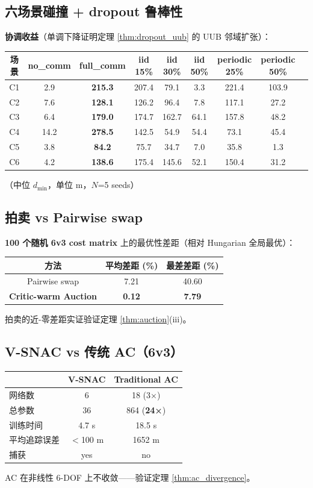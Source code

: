 \documentclass[11pt,a4paper]{article}
\theoremstyle{remark}
\begin{document}
\subsection{六场景碰撞 + dropout 鲁棒性}

\textbf{协调收益}（单调下降证明定理 \ref{thm:dropout_uub} 的 UUB 邻域扩张）：
\begin{center}
\begin{tabular}{c|cccccccc}
\hline
场景 & no\_comm & full\_comm & iid 15\% & iid 30\% & iid 50\% & periodic 25\% & periodic 50\% \\
\hline
C1 & 2.9 & \textbf{215.3} & 207.4 & 79.1 & 3.3 & 221.4 & 103.9 \\
C2 & 7.6 & \textbf{128.1} & 126.2 & 96.4 & 7.8 & 117.1 & 27.2 \\
C3 & 6.4 & \textbf{179.0} & 174.7 & 162.7 & 64.1 & 157.8 & 48.2 \\
C4 & 14.2 & \textbf{278.5} & 142.5 & 54.9 & 54.4 & 73.1 & 45.4 \\
C5 & 3.8 & \textbf{84.2} & 75.7 & 34.7 & 7.0 & 35.8 & 1.3 \\
C6 & 4.2 & \textbf{138.6} & 175.4 & 145.6 & 52.1 & 150.4 & 31.2 \\
\hline
\end{tabular}
\end{center}
（中位 $d_{\min}$，单位 m，$N$=5 seeds）

\subsection{拍卖 vs Pairwise swap}

\textbf{100 个随机 6v3 cost matrix} 上的最优性差距（相对 Hungarian 全局最优）：
\begin{center}
\begin{tabular}{c|cc}
\hline
方法 & 平均差距 (\%) & 最差差距 (\%)\\
\hline
Pairwise swap & 7.21 & 40.60 \\
\textbf{Critic-warm Auction} & \textbf{0.12} & \textbf{7.79} \\
\hline
\end{tabular}
\end{center}
拍卖的近-零差距实证验证定理 \ref{thm:auction}(iii)。

\subsection{V-SNAC vs 传统 AC（6v3）}

\begin{center}
\begin{tabular}{l|cc}
\hline
& V-SNAC & Traditional AC \\
\hline
网络数 & 6 & 18 (3×) \\
总参数 & 36 & 864 (\textbf{24×}) \\
训练时间 & 4.7 s & 18.5 s \\
平均追踪误差 & $<$100 m & 1652 m \\
捕获 & yes & no \\
\hline
\end{tabular}
\end{center}
AC 在非线性 6-DOF 上不收敛——验证定理 \ref{thm:ac_divergence}。
\end{document}
